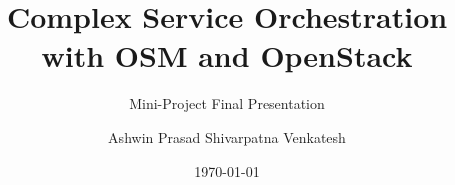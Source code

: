 \title{Complex Service Orchestration with OSM and OpenStack} 

\subtitle{Mini-Project Final Presentation}

\author{Ashwin Prasad Shivarpatna Venkatesh}


\date{\today} 

\newcommand{\upbcolor}{uni-blue} 

